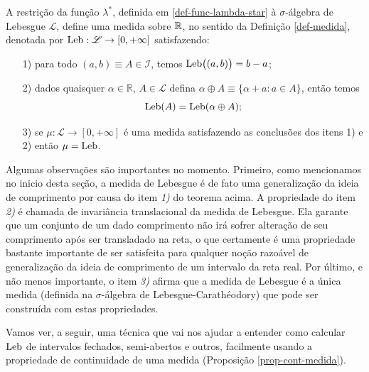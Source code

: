         \begin{teorema}
        \label{teo-def-medida-lebesgue}
            A restrição da função $\lambda^{*}$, definida em \eqref{def-func-lambda-star}
            à $\sigma$-álgebra de Lebesgue $\mathscr{L}$, define uma medida sobre $\mathbb{R}$, 
            no sentido da Definição \ref{def-medida}, 
            denotada por $\mathrm{Leb}:\mathscr{L}\to[0,+\infty]$  satisfazendo:
            \begin{itemize}
                \item[1)] para todo $(a,b)\equiv A\in\mathcal{I}$, temos $\mathrm{Leb}\big((a,b)\big)=b-a$;
                
                \item[2)] dados quaisquer $\alpha\in\mathbb{R}$,  $A\in\mathscr{L}$
                defina $\alpha\oplus A\equiv \{\alpha+a: a\in A\}$,
                então temos
                \[\mathrm{Leb}(A)=\mathrm{Leb}(\alpha\oplus A);\]
                
                \item[3)] se $\mu:\mathscr{L}\to [0,+\infty]$ é 
                uma medida satisfazendo as conclusões dos itens 1) e 2) então 
                $\mu=\mathrm{Leb}$. 
            \end{itemize}
        \end{teorema}
        Algumas observações são importantes no momento. 
        Primeiro, como mencionamos no inicio desta seção, a medida de
        Lebesgue é de fato uma generalização da ideia de comprimento 
        por causa do item {\it 1)} do teorema acima. 
        A propriedade do item {\it 2)} é chamada de invariância translacional
        da medida de Lebesgue. Ela garante que um conjunto de um dado comprimento 
        não irá sofrer alteração de seu comprimento após ser transladado na reta,
        o que certamente é uma propriedade bastante importante 
        de ser satisfeita para qualquer noção razoável de 
        generalização da ideia de comprimento de um intervalo da reta real.  
        Por último, e não menos importante, o item {\it 3)} afirma que a medida de Lebesgue 
        é a única medida (definida na $\sigma$-álgebra de Lebesgue-Carathéodory) 
        que pode ser construída com estas propriedades. 
        
        Vamos ver, a seguir, uma técnica que vai nos ajudar a entender 
        como calcular $\mathrm{Leb}$ de intervalos fechados, 
        semi-abertos e outros, facilmente usando a propriedade
        de continuidade de uma medida (Proposição \ref{prop-cont-medida}).
        
